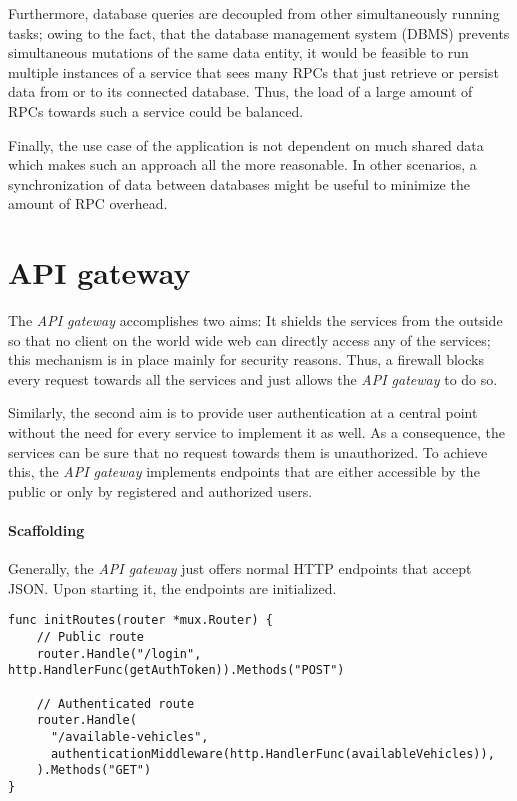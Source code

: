 \documentclass[12pt,a4paper,twoside]{report}
\begin{document}
Furthermore, database queries are decoupled from other simultaneously running tasks;
owing to the fact, that the database management system (DBMS) prevents
simultaneous mutations of the same data entity, it would be feasible
to run multiple instances of a service that sees many RPCs that just
retrieve or persist data from or to its connected database.
Thus, the load of a large amount of RPCs towards such a service could be balanced.

Finally, the use case of the application is not dependent on much
shared data which makes such an approach all the more reasonable.
In other scenarios, a synchronization of data between databases might be useful
to minimize the amount of RPC overhead.


\section{API gateway} \label{sect:api-gateway}

The \textit{API gateway} accomplishes two aims:
It shields the services from the outside so that no client on the world wide web
can directly access any of the services; this mechanism is in place mainly for
security reasons.
Thus, a firewall blocks every request towards all the services and just allows
the \textit{API gateway} to do so.

Similarly, the second aim is to provide user authentication
at a central point without the need for every service to implement it as well.
As a consequence, the services can be sure that no request towards them is unauthorized.
To achieve this, the \textit{API gateway} implements endpoints that are either
accessible by the public or only by registered and authorized users.

\paragraph{Scaffolding}
Generally, the \textit{API gateway} just offers normal HTTP endpoints that accept
JSON. Upon starting it, the endpoints are initialized.

\begin{lstlisting}[title=api-gateway/main.go]
func initRoutes(router *mux.Router) {
	// Public route
	router.Handle("/login", http.HandlerFunc(getAuthToken)).Methods("POST")

	// Authenticated route
	router.Handle(
      "/available-vehicles",
      authenticationMiddleware(http.HandlerFunc(availableVehicles)),
    ).Methods("GET")
}
\end{lstlisting}
\end{document}
